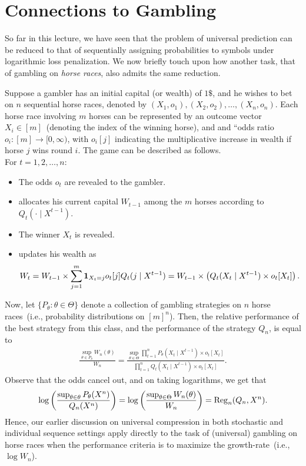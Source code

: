 \documentclass[12pt]{article}
\begin{document}
\section{Connections to Gambling}
So far in this lecture, we have seen that the problem of universal prediction can be reduced to that of sequentially assigning probabilities to symbols under logarithmic loss penalization. We now briefly touch upon how another task, that of gambling on \emph{horse races}, also admits the same reduction. 

Suppose a gambler has an initial capital (or wealth) of $1\$$, and he wishes to bet on $n$ sequential horse races, denoted by $(X_1, o_1), (X_2, o_2), \ldots, (X_n, o_n)$. Each horse race involving $m$ horses can be represented by an outcome vector $X_i \in [m]$~(denoting the index of the winning horse), and and ``odds ratio $o_i:[m] \to [0, \infty)$, with $o_i[j]$ indicating the multiplicative increase in wealth if horse $j$ wins round $i$. The game can be described as follows.\\
For $t=1, 2, \ldots, n$: 
\begin{itemize}
    \item The odds $o_t$ are revealed to the gambler. 
    \item \gambler allocates his current capital $W_{t-1}$ among the $m$ horses according to $Q_t(\cdot \mid X^{t-1})$. 
    \item The winner $X_t$ is revealed. 
    \item \gambler updates his wealth as 
    \begin{align}
        W_t = W_{t-1} \times \sum_{j=1}^m \boldsymbol{1}_{X_t=j} o_t[j] Q_t(j \mid X^{t-1}) = W_{t-1} \times \left( Q_t(X_t \mid X^{t-1}) \times o_t[X_t] \right). 
    \end{align}
\end{itemize}
Now, let $\{P_\theta: \theta \in \Theta\}$ denote a collection of gambling strategies on $n$ horse races~(i.e., probability distributions on $[m]^n$). Then, the relative performance of the best strategy from this class, and the performance of the strategy $Q_n$, is equal to 
\begin{align}
    \frac{\sup_{\theta \in P_\theta} W_n(\theta)}{W_n} = \frac { \sup_{\theta \in \Theta}\prod_{t=1}^n P_\theta(X_t \mid X^{t-1})  \times o_t[X_t]}{ \prod_{t=1}^n Q_t(X_t \mid X^{t-1})  \times o_t[X_t]}. 
\end{align}
Observe that the odds cancel out, and on taking logarithms, we get that 
\begin{align}
   \log \left( \frac{\sup_{\theta \in \theta} P_\theta(X^n)}{Q_n(X^n)}  \right) = \log \left( \frac{\sup_{\theta \in \Theta} W_n(\theta)}{W_n}  \right) = \mathrm{Reg}_n(Q_n, X^n).  
\end{align}
Hence, our earlier discussion on universal compression in both stochastic and individual sequence settings apply directly to the task of (universal) gambling on horse races when the performance criteria is to maximize the growth-rate~(i.e., $\log W_n$). 
    

\end{document}
